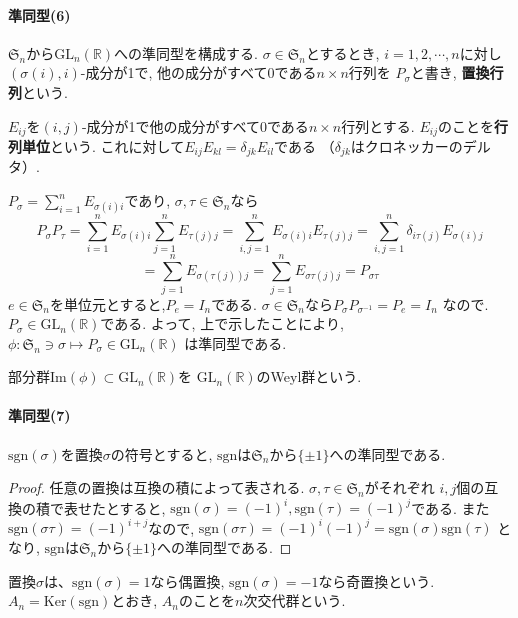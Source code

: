 \paragraph*{準同型(6)}
$\mathfrak{S}_n$から$\mathrm{GL}_n(\mathbb{R})$への準同型を構成する.
$\sigma \in \mathfrak{S}_n$とするとき, $i=1,2,\cdots,n$に対し
$(\sigma(i),i)$-成分が1で, 他の成分がすべて0である$n\times n$行列を
$P_\sigma$と書き, \textbf{置換行列}という.

$E_{ij}$を$(i,j)$-成分が1で他の成分がすべて0である$n\times n$行列とする.
$E_{ij}$のことを\textbf{行列単位}という.
これに対して$E_{ij} E_{kl} = \delta_{jk}E_{il}$である
（$ \delta_{jk}$はクロネッカーのデルタ）.

$P_\sigma = \sum_{i=1}^n E_{\sigma(i)i}$であり,
$\sigma,\tau \in \mathfrak{S}_n $なら
\[ P_\sigma P_\tau = \sum_{i=1}^n E_{\sigma(i)i} \sum_{j=1}^n E_{\tau(j)j} 
 = \sum_{i,j = 1}^n E_{\sigma(i)i} E_{\tau(j)j} 
 = \sum_{i,j=1}^n \delta_{i\tau(j)} E_{\sigma(i)j} \]
\[= \sum_{j=1}^n E_{\sigma(\tau(j))j} = \sum_{j=1}^n E_{\sigma\tau(j)j} 
 = P_{\sigma\tau} \]
$ e \in \mathfrak{S}_n$を単位元とすると,$P_e = I_n$である.
$\sigma \in \mathfrak{S}_n$なら$P_\sigma P_{\sigma^{-1}} = P_e = I_n$
なので.$P_\sigma \in \mathrm{GL}_n(\mathbb{R})$である.
よって, 上で示したことにより, 
$\phi: \mathfrak{S}_n \ni \sigma \mapsto P_\sigma \in \mathrm{GL}_n(\mathbb{R})$
は準同型である.

部分群$\mathrm{Im}(\phi) \subset \mathrm{GL}_n(\mathbb{R}) $を
$\mathrm{GL}_n(\mathbb{R})$のWeyl群という.\newline

\paragraph*{準同型(7)}
$\mathrm{sgn}(\sigma)$を置換$\sigma$の符号とすると,
$\mathrm{sgn}$は$\mathfrak{S}_n$から$\{\pm 1\}$への準同型である.
\begin{proof}
	任意の置換は互換の積によって表される.
	$\sigma, \tau \in \mathfrak{S}_n$がそれぞれ
	$i, j$個の互換の積で表せたとすると,
	$\mathrm{sgn}(\sigma) = (-1)^i, \mathrm{sgn}(\tau)=(-1)^j$である.
	また$\mathrm{sgn}(\sigma\tau) = (-1)^{i+j}$なので,
	$\mathrm{sgn}(\sigma\tau) = (-1)^i (-1)^j = \mathrm{sgn}(\sigma) \mathrm{sgn}(\tau) $
	となり, $\mathrm{sgn}$は$\mathfrak{S}_n$から$\{\pm 1\}$への準同型である.
\end{proof}
置換$\sigma$は、$\mathrm{sgn}(\sigma)=1$なら偶置換,
$\mathrm{sgn}(\sigma)=-1$なら奇置換という.
$A_n = \mathrm{Ker}(\mathrm{sgn})$とおき, $A_n$のことを$n$次交代群という.
\newline

